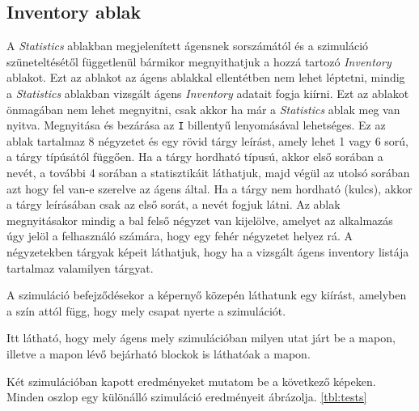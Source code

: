 \subsection{Inventory ablak}
A \textit{Statistics} ablakban megjelenített ágensnek sorszámától és a szimuláció szüneteltésétől függetlenül bármikor megnyithatjuk a hozzá tartozó \textit{Inventory} ablakot.
Ezt az ablakot az ágens ablakkal ellentétben nem lehet léptetni, mindig a \textit{Statistics} ablakban vizsgált ágens \textit{Inventory} adatait fogja kiírni.
Ezt az ablakot önmagában nem lehet megnyitni, csak akkor ha már a \textit{Statistics} ablak meg van nyitva.
Megnyitása és bezárása az \texttt{I} billentyű lenyomásával lehetséges.
Ez az ablak tartalmaz 8 négyzetet és egy rövid tárgy leírást, amely lehet 1 vagy 6 sorú, a tárgy típúsától függően. Ha a tárgy hordható típusú, akkor első sorában a nevét, 
a további 4 sorában a statisztikáit láthatjuk, majd végül az utolsó sorában azt hogy fel van-e szerelve az ágens által. Ha a tárgy nem hordható (kulcs), 
akkor a tárgy leírásában csak az első sorát, a nevét fogjuk látni.
Az ablak megnyitásakor mindig a bal felső négyzet van kijelölve, amelyet az alkalmazás úgy jelöl a felhasználó számára, hogy egy fehér négyzetet helyez rá.
A négyzetekben tárgyak képeit láthatjuk, hogy ha a vizsgált ágens inventory listája tartalmaz valamilyen tárgyat.


A szimuláció befejződésekor a képernyő közepén láthatunk egy kiírást, amelyben a szín attól függ, hogy mely csapat nyerte a szimulációt.


Itt látható, hogy mely ágens mely szimulációban milyen utat járt be a mapon, illetve a mapon lévő bejárható blockok is láthatóak a mapon.

Két szimulációban kapott eredményeket mutatom be a következő képeken. Minden oszlop egy különálló szimuláció eredményeit ábrázolja. \ref{tbl:tests}

